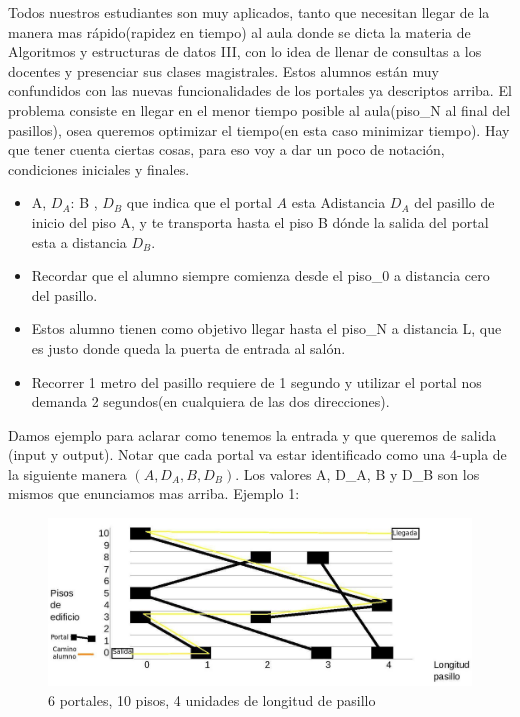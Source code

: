 Todos nuestros estudiantes son muy aplicados, tanto que necesitan llegar de la manera mas rápido(rapidez en tiempo) al aula donde se dicta la materia de  Algoritmos y estructuras de datos III, con lo idea de llenar de consultas a los docentes y presenciar sus clases magistrales. Estos alumnos están muy confundidos con las nuevas funcionalidades de los portales ya descriptos arriba.
El problema consiste en llegar en el menor tiempo posible al aula(piso_N al final del pasillos), osea queremos optimizar el tiempo(en esta caso minimizar tiempo).
Hay que tener cuenta ciertas cosas, para eso voy a dar un poco de notación, condiciones iniciales y finales.
\begin{itemize}
	\item A, $D_A$: B , $D_B$ que indica que el portal $A$ esta Adistancia $D_A$ del pasillo de inicio del piso A, y  te transporta hasta el piso B dónde la salida del portal esta a distancia $D_B$.
	\item Recordar que el alumno siempre comienza desde el piso_0 a distancia cero del pasillo.
	\item Estos alumno tienen como objetivo llegar hasta el piso_N a distancia L, que es justo donde queda la puerta de entrada al salón.
	\item Recorrer 1 metro del pasillo requiere de 1 segundo y utilizar el portal nos demanda 2 segundos(en cualquiera de las dos direcciones). 	 
\end{itemize}
 Damos ejemplo para aclarar como tenemos la entrada y que queremos de salida (input y output).
 Notar que cada portal va estar identificado como una 4-upla  de la siguiente manera $(A,D_A,B,D_B)$. Los valores A, D_A, B y D_B son los mismos que enunciamos mas arriba. 
 \newline
Ejemplo 1:
\begin{figure}[H]
 \begin{center}
     \includegraphics[scale=0.30]{imagenes/ejercicio2ej1.jpg}
 \end{center}
 \caption{ 6 portales, 10 pisos, 4 unidades de longitud de pasillo}
 \label{nCte}
\end{figure}

